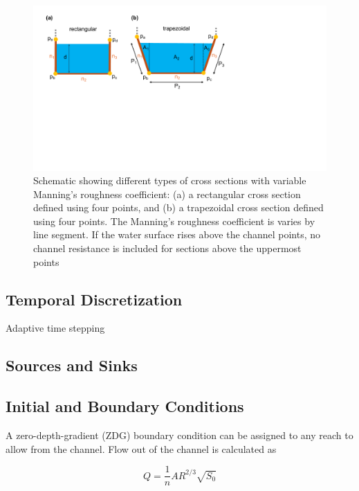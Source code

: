 \documentclass[fleqn]{article}
\begin{document}
\begin{figure}[h!tbp]
	\centering
	\includegraphics[scale=0.5]{figures/cxs_rough.pdf}
	\caption[Schematic showing different types of channel cross sections with variable roughness.]{Schematic showing different types of cross sections with variable Manning's roughness coefficient: (a) a rectangular cross section defined using four points, and (b) a trapezoidal cross section defined using four points.  The Manning's roughness coefficient is varies by line segment.  If the water surface rises above the channel points, no channel resistance is included for sections above the uppermost points}
	\label{fig:cxs_rough}
\end{figure}


\subsection{Temporal Discretization}
Adaptive time stepping

\subsection{Sources and Sinks}

\subsection{Initial and Boundary Conditions}

A zero-depth-gradient (ZDG) boundary condition can be assigned to any reach to allow from the channel.  Flow out of the channel is calculated as

\begin{equation}
  Q = \frac{1}{n}A R^{2/3} \sqrt{S_0}
\end{equation}
\end{document}
